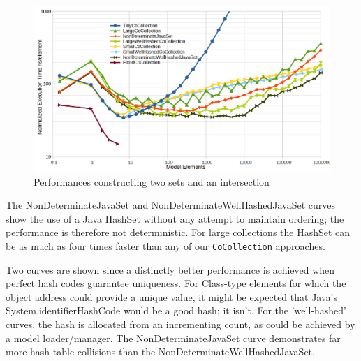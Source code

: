 \documentclass[
]{ceurart}
\begin{document}
\begin{figure}
	\begin{center}
		\includegraphics[width=6.0in]{ConstructionPlusIntersection.png}
	\end{center}
	\caption{Performances constructing two sets and an intersection}
	\label{fig:ConstructionPlusIntersection}
	\vspace{-20pt}
\end{figure}

The NonDeterminateJavaSet and NonDeterminateWellHashedJavaSet curves show the use of a Java HashSet without any attempt to maintain ordering; the performance is therefore not deterministic. For large collections the HashSet can be as much as four times faster than any of our \verb!CoCollection! approaches.

Two curves are shown since a distinctly better performance is achieved when perfect hash codes guarantee uniqueness. For Class-type elements for which the object address could provide a unique value, it might be expected that Java's System.identifierHashCode would be a good hash; it isn't. For the 'well-hashed' curves, the hash is allocated from an incrementing count, as could be achieved by a model loader/manager. The NonDeterminateJavaSet curve demonstrates far more hash table collisions than the NonDeterminateWellHashedJavaSet.

\end{document}
